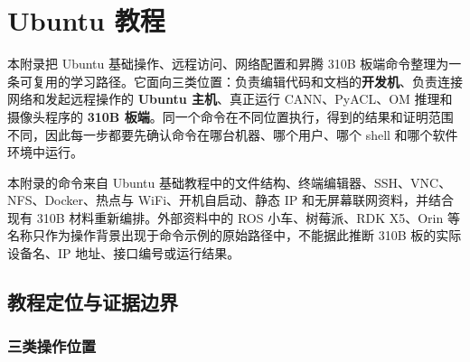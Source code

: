 \chapter{Ubuntu 教程}\label{ux9644ux5f55-2ubuntu-ux6559ux7a0b}

本附录把 Ubuntu 基础操作、远程访问、网络配置和昇腾 310B
板端命令整理为一条可复用的学习路径。它面向三类位置：负责编辑代码和文档的\textbf{开发机}、负责连接网络和发起远程操作的
\textbf{Ubuntu 主机}、真正运行 CANN、PyACL、OM 推理和摄像头程序的
\textbf{310B
板端}。同一个命令在不同位置执行，得到的结果和证明范围不同，因此每一步都要先确认命令在哪台机器、哪个用户、哪个
shell 和哪个软件环境中运行。

本附录的命令来自 Ubuntu
基础教程中的文件结构、终端编辑器、SSH、VNC、NFS、Docker、热点与
WiFi、开机自启动、静态 IP 和无屏幕联网资料，并结合现有 310B
材料重新编排。外部资料中的 ROS 小车、树莓派、RDK X5、Orin
等名称只作为操作背景出现于命令示例的原始路径中，不能据此推断 310B
板的实际设备名、IP 地址、接口编号或运行结果。

\section{教程定位与证据边界}\label{src-appendix-appendix2-scope}

\subsection{三类操作位置}\label{ux4e09ux7c7bux64cdux4f5cux4f4dux7f6e}

